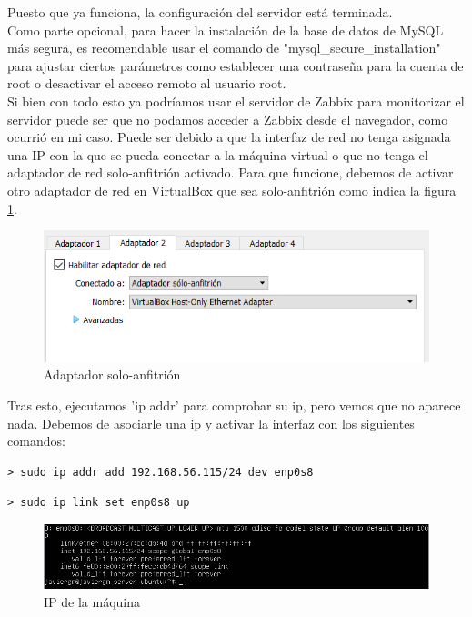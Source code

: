 Puesto que ya funciona, la configuración del servidor está terminada.\\

Como parte opcional, para hacer la instalación de la base de datos de MySQL más segura, es recomendable usar el comando de "mysql\_secure\_installation" para ajustar ciertos parámetros como establecer una contraseña para la cuenta de root o desactivar el acceso remoto al usuario root.\\

Si bien con todo esto ya podríamos usar el servidor de Zabbix para monitorizar el servidor puede ser que no podamos acceder a Zabbix desde el navegador, como ocurrió en mi caso. Puede ser debido a que la interfaz de red no tenga asignada una IP con la que se pueda conectar a la máquina virtual o que no tenga el adaptador de red solo-anfitrión activado. Para que funcione, debemos de activar otro adaptador de red en VirtualBox que sea solo-anfitrión como indica la figura \ref{fig:adaptador}.\\

\begin{figure}[H]
  \centering
  \includegraphics{Captura10}
  \caption{Adaptador solo-anfitrión}
  \label{fig:adaptador}
\end{figure}

Tras esto, ejecutamos 'ip addr' para comprobar su ip, pero vemos que no aparece nada. Debemos de asociarle una ip y activar la interfaz con los siguientes comandos:

\begin{lstlisting}
> sudo ip addr add 192.168.56.115/24 dev enp0s8
\end{lstlisting}

\begin{lstlisting}
> sudo ip link set enp0s8 up
\end{lstlisting}

\begin{figure}[H]
  \centering
  \includegraphics[scale=0.8]{Captura11}
  \caption{IP de la máquina}
  \label{fig:ip}
\end{figure}

